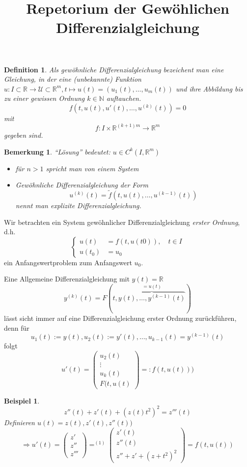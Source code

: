\documentclass[11pt]{article}
\title{Repetorium der Gew\"ohlichen Differenzialgleichung}
\newcommand{\RR}{\mathbb{R}}
\newcommand{\NN}{\mathbb{N}}
\newcommand{\UU}{\mathcal{U}}
\newcounter{myCounter}[section]
\newtheorem{Def}[myCounter]{Definition}
\newtheorem{Bem}[myCounter]{Bemerkung}
\newtheorem{Bsp}[myCounter]{Beispiel}
\begin{document}
\maketitle

\begin{Def}
  Als gew\"ohnliche Differenzialgleichung bezeichent man eine Gleichung, in der eine (unbekannte)
  Funktion $u: I \subset \RR \rightarrow \UU \subset \RR^m , t \mapsto u(t)=
  (u_1(t), \dotsc, u_m(t))$ und ihre Abbildung bis zu einer gewissen Ordnung $
  k \in \NN$ auftauchen. \[
    f(t,u(t), u'(t), \dotsc, u^{(k)}(t)) = 0 \]
  mit \[
    f:I \times \RR^{(k+1)m} \rightarrow \RR^m \]
  gegeben sind.
\end{Def}

\begin{Bem}
  ``L\"osung'' bedeutet: $u\in C^k(I,\RR^m)$
  \begin{itemize}
  \item f\"ur $n > 1$ spricht man von einem System
  \item Gew\"ohnliche Differenzialgleichung der Form \[
    u^{(k)}(t) = \tilde{f}(t,u(t),\dotsc,u^{(k-1)}(t)) \]
    nennt man \emph{explizite} Differenzialgleichung.
  \end{itemize}
\end{Bem}
Wir betrachten ein System gew\"ohnlicher Differenzialgleichung \emph{erster Ordnung}, d.h.\[
  \left\{\begin{aligned} u(t) &= f(t,u(t0)), \quad t \in I \\ u(t_0) &= u_0
  \end{aligned} \right. \]
ein Anfangswertproblem zum Anfangswert $u_0$.

Eine Allgemeine Differenzialgleichung mit $y(t) = \RR$ \[
  y^{(k)}(t) = F(t,\overbrace{y(t),\dotsc,y^{(k-1)}(t)}^{=u(t)}) \]
l\"asst sicht immer auf eine Differenzialgleichung erster Ordnung zur\"uckf\"uhren, denn f\"ur
\[ u_1(t):=y(t), u_2(t) := y'(t), \dotsc, u_{k-1}(t)=y^{(k-1)}(t) \] folgt \[
  u'(t) = \begin{pmatrix} u_2(t) \\ \vdots \\ u_k(t) \\ F(t,u(t) \end{pmatrix} =
: f(t,u(t))) \]

\begin{Bsp}
\[ z''(t) + z'(t) + (z(t)t^2)^2 = z'''(t) \tag{1} \]
Definieren $u(t) = z(t), z'(t), z''(t) )$ \[
  \Rightarrow u'(t) = \begin{pmatrix} z' \\ z'' \\ z''' \end{pmatrix}  
  \mathop{=}^{(1)} \begin{pmatrix} z'(t) \\ z''(t) \\ z'' + z' + (z + t^2)^2
  \end{pmatrix} = f(t,u(t)) \]
\end{Bsp}
\end{document}
